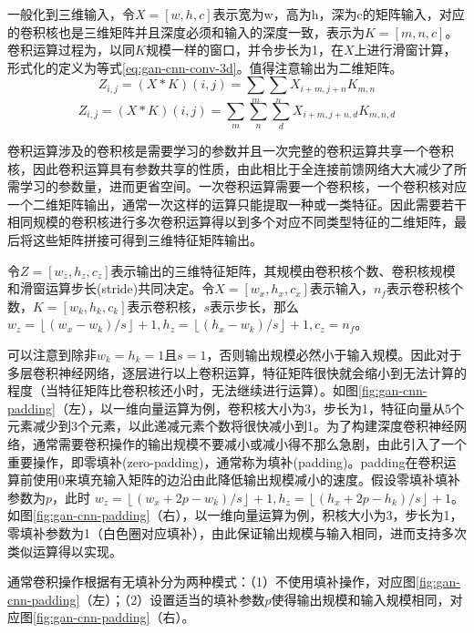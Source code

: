 一般化到三维输入，令$X=[w, h, c]$表示宽为w，高为h，深为c的矩阵输入，对应的卷积核也是三维矩阵并且深度必须和输入的深度一致，表示为$K=[m, n, c]$。卷积运算过程为，以同$K$规模一样的窗口，并令步长为1，在$X$上进行滑窗计算，形式化的定义为等式\ref{eq:gan-cnn-conv-3d}。值得注意输出为二维矩阵。
\begin{equation}
\label{eq:gan-cnn-conv}
Z_{i,j} = (X*K)(i,j) = \sum_{m}\sum_{n}X_{i+m, j+n}K_{m,n}
\end{equation}
\begin{equation}
\label{eq:gan-cnn-conv-3d}
Z_{i,j} = (X*K)(i,j) = \sum_{m}\sum_{n}\sum_{d}X_{i+m, j+n,d}K_{m,n,d}
\end{equation}

卷积运算涉及的卷积核是需要学习的参数并且一次完整的卷积运算共享一个卷积核，因此卷积运算具有参数共享的性质，由此相比于全连接前馈网络大大减少了所需学习的参数量，进而更省空间。一次卷积运算需要一个卷积核，一个卷积核对应一个二维矩阵输出，通常一次这样的运算只能提取一种或一类特征。因此需要若干相同规模的卷积核进行多次卷积运算得以到多个对应不同类型特征的二维矩阵，最后将这些矩阵拼接可得到三维特征矩阵输出。

令$Z=[w_{z}, h_{z}, c_{z}]$表示输出的三维特征矩阵，其规模由卷积核个数、卷积核规模和滑窗运算步长(stride)共同决定。令$X=[w_{x}, h_{x}, c_{x}]$表示输入，$n_{f}$表示卷积核个数，$K=[w_{k},h_{k},c_{k}]$表示卷积核，$s$表示步长，那么$w_{z} = \left \lfloor (w_{x} - w_{k})/s \right \rfloor + 1, h_{z} = \left \lfloor (h_{x} - w_{k})/s \right \rfloor + 1, c_{z} = n_{f}$。

可以注意到除非$w_{k}=h_{k}=1$且$s=1$，否则输出规模必然小于输入规模。因此对于多层卷积神经网络，逐层进行以上卷积运算，特征矩阵很快就会缩小到无法计算的程度（当特征矩阵比卷积核还小时，无法继续进行运算）。如图\ref{fig:gan-cnn-padding}（左），以一维向量运算为例，卷积核大小为3，步长为1，特征向量从5个元素减少到3个元素，以此递减元素个数将很快减小到1。为了构建深度卷积神经网络，通常需要卷积操作的输出规模不要减小或减小得不那么急剧，由此引入了一个重要操作，即零填补(zero-padding)，通常称为填补(padding)。padding在卷积运算前使用0来填充输入矩阵的边沿由此降低输出规模减小的速度。假设零填补填补参数为$p$，此时 $w_{z} = \left \lfloor (w_{x}+2p-w_{k})/s \right \rfloor + 1, h_{z} = \left \lfloor (h_{x}+2p-h_{k})/s \right \rfloor+1$。如图\ref{fig:gan-cnn-padding}（右），以一维向量运算为例，积核大小为3，步长为1，零填补参数为1（白色圈对应填补），由此保证输出规模与输入相同，进而支持多次类似运算得以实现。

通常卷积操作根据有无填补分为两种模式：（1）不使用填补操作，对应图\ref{fig:gan-cnn-padding}（左）；（2）设置适当的填补参数$p$使得输出规模和输入规模相同，对应图\ref{fig:gan-cnn-padding}（右）。

